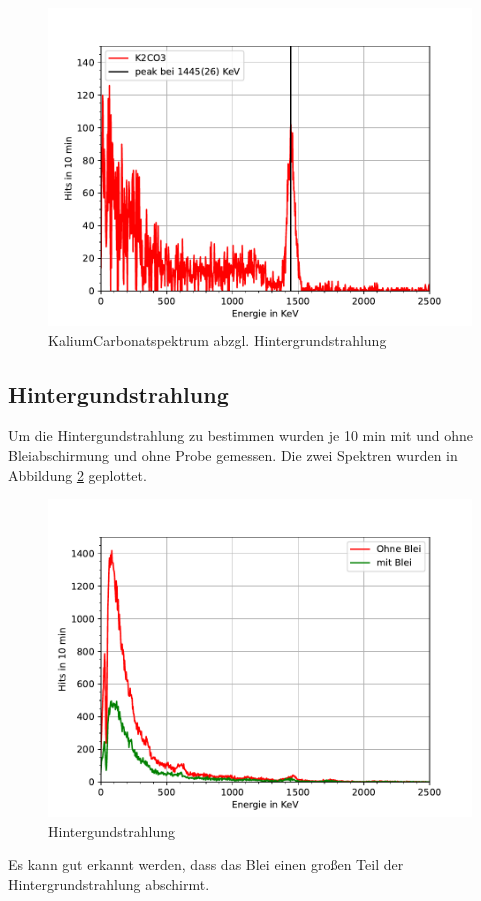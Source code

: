 \documentclass[11pt, a4paper]{article}
\begin{document}
    \begin{figure}[!h]
        \centering
        \includegraphics[width=\textwidth]{Plots/K2CO3.pdf}

        \caption{KaliumCarbonatspektrum abzgl. Hintergrundstrahlung}
        \label{fig:Kaspektrum}
    \end{figure}


    \subsection{Hintergundstrahlung}
    Um die Hintergundstrahlung zu bestimmen wurden je 10 min mit und ohne Bleiabschirmung und ohne Probe gemessen. Die zwei Spektren wurden in Abbildung \ref{fig:hintergrund} geplottet.
    \begin{figure}[!h]
        \centering
        \includegraphics[width=\textwidth]{Plots/Untergrund.pdf}
        \caption{Hintergundstrahlung}
        \label{fig:hintergrund}
    \end{figure}
    Es kann gut erkannt werden, dass das Blei einen großen Teil der Hintergrundstrahlung abschirmt.
\end{document}
